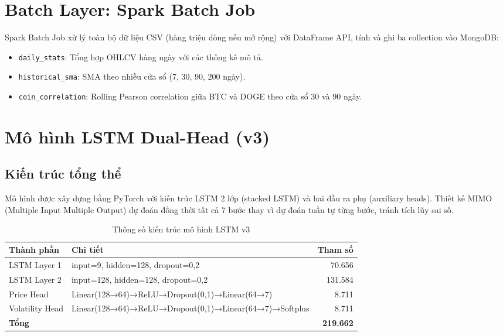 \documentclass[12pt, a4paper]{report}
\begin{document}
\section{Batch Layer: Spark Batch Job}

Spark Batch Job xử lý toàn bộ dữ liệu CSV (hàng triệu dòng nếu mở rộng) với DataFrame
API, tính và ghi ba collection vào MongoDB:

\begin{itemize}
  \item \texttt{daily\_stats}: Tổng hợp OHLCV hàng ngày với các thống kê mô tả.
  \item \texttt{historical\_sma}: SMA theo nhiều cửa sổ (7, 30, 90, 200 ngày).
  \item \texttt{coin\_correlation}: Rolling Pearson correlation giữa BTC và DOGE
    theo cửa sổ 30 và 90 ngày.
\end{itemize}

\section{Mô hình LSTM Dual-Head (v3)}

\subsection{Kiến trúc tổng thể}

Mô hình được xây dựng bằng PyTorch \cite{ref8} với kiến trúc LSTM 2 lớp (stacked LSTM)
và hai đầu ra phụ (auxiliary heads). Thiết kế MIMO (Multiple Input Multiple Output) dự
đoán đồng thời tất cả 7 bước thay vì dự đoán tuần tự từng bước, tránh tích lũy sai số.

\begin{table}[H]
  \centering
  \caption{Thông số kiến trúc mô hình LSTM v3}
  \label{tab:model_arch}
  \begin{tabular}{llr}
    \toprule
    Thành phần & Chi tiết & Tham số \\
    \midrule
    LSTM Layer 1 & input=9, hidden=128, dropout=0,2 & 70.656 \\
    LSTM Layer 2 & input=128, hidden=128, dropout=0,2 & 131.584 \\
    Price Head & Linear(128→64)→ReLU→Dropout(0,1)→Linear(64→7) & 8.711 \\
    Volatility Head & Linear(128→64)→ReLU→Dropout(0,1)→Linear(64→7)→Softplus & 8.711 \\
    \midrule
    \textbf{Tổng} & & \textbf{219.662} \\
    \bottomrule
  \end{tabular}
\end{table}
\end{document}
